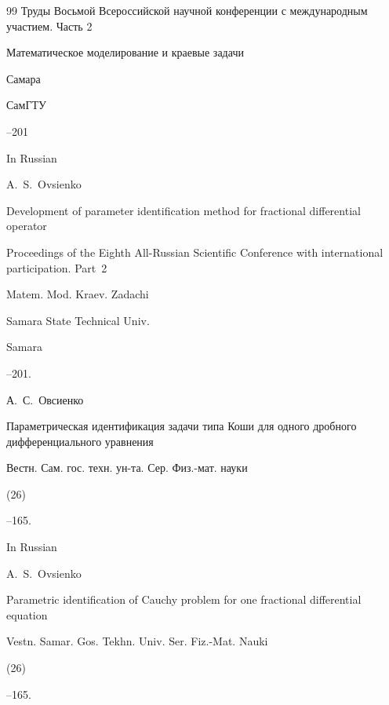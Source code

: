 \begin{thebibliography}{99}
\inbook Труды Восьмой Всероссийской научной конференции с международным участием. \rm Часть 2

\serial Математическое моделирование и краевые задачи


\publaddr Самара

\publ СамГТУ

--201

\misctransl

\lang In Russian

\by A.~S.~Ovsienko

\paper Development of  parameter identification method for  fractional differential operator

\inbook Proceedings of the Eighth All-Russian Scientific Conference with international participation. \rm Part~2

\serial Matem. Mod. Kraev. Zadachi


\publ Samara State Technical Univ.

\publaddr Samara

--201.








\by А.~С.~Овсиенко

\paper Параметрическая идентификация задачи типа Коши для одного дробного дифференциального уравнения

\jour Вестн. Сам. гос. техн. ун-та. Сер. Физ.-мат. науки


(26)

--165.



\misctransl

\lang In Russian

\by A.~S.~Ovsienko

\paper Parametric identification of Cauchy problem for one fractional differential equation

\jour Vestn. Samar. Gos. Tekhn. Univ. Ser. Fiz.-Mat. Nauki


(26)

--165.












\end{thebibliography}
